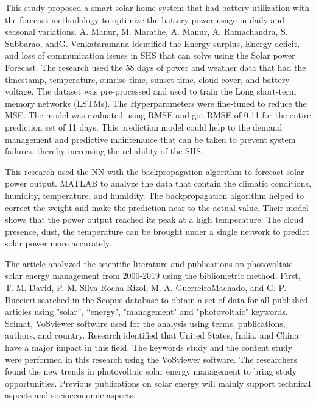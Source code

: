 \documentclass[conference]{IEEEtran}
\begin{document}
This study\cite{9070340}  proposed a smart solar home system that had battery utilization with the forecast methodology to optimize the battery power usage in daily and seasonal variations. A.  Manur,  M.  Marathe,  A.  Manur,  A.  Ramachandra,  S.  Subbarao,  andG. Venkataramana \cite{9070340}  identified the Energy surplus, Energy deficit, and loss of communication issues in SHS that can solve using the Solar power Forecast. The research used the 58 days of power and weather data that had the timestamp, temperature, sunrise time, sunset time, cloud cover, and battery voltage. The dataset was pre-processed and used to train the Long short-term memory networks (LSTMs). The Hyperparameters were fine-tuned to reduce the MSE.  The model was evaluated using RMSE and got RMSE of 0.11 for the entire prediction set of 11 days. This prediction model could help to the demand management and predictive maintenance that can be taken to prevent system failures, thereby increasing the reliability of the SHS.

This research\cite{8286013} used the NN with the backpropagation algorithm to forecast solar power output. MATLAB to analyze the data that contain the climatic conditions, humidity, temperature, and humidity. The backpropagation algorithm helped to correct the weight and make the prediction near to the actual value. Their\cite{8286013} model shows that the power output reached its peak at a high temperature. The cloud presence, dust, the temperature can be brought under a single network to predict solar power more accurately.

The article\cite{DAVID2020e04452} analyzed the scientific literature and publications on photovoltaic solar energy management from 2000-2019 using the bibliometric method. First, T.    M.    David,    P.    M.    Silva    Rocha    Rizol,    M.    A.    GuerreiroMachado,   and   G.   P.   Buccieri \cite{DAVID2020e04452}  searched in the Scopus database to obtain a set of data for all published articles using "solar”, “energy", "management" and "photovoltaic" keywords. Scimat, VoSviewer software used for the analysis using terms, publications, authors, and country.  Research \cite{DAVID2020e04452} identified that United States, India, and China have a major impact in this field. The keywords study and the content study were performed in this research using the VoSviewer software. The researchers\cite{DAVID2020e04452}  found the new trends in photovoltaic solar energy management to bring study opportunities. Previous publications on solar energy will mainly support technical aspects and socioeconomic aspects. 
\end{document}
